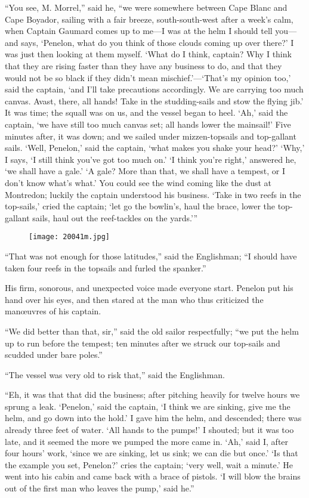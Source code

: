 “You see, M. Morrel,” said he, “we were somewhere between Cape Blanc
and Cape Boyador, sailing with a fair breeze, south-south-west after a
week’s calm, when Captain Gaumard comes up to me—I was at the helm I
should tell you—and says, ‘Penelon, what do you think of those clouds
coming up over there?’ I was just then looking at them myself. ‘What do
I think, captain? Why I think that they are rising faster than they
have any business to do, and that they would not be so black if they
didn’t mean mischief.’—‘That’s my opinion too,’ said the captain, ‘and
I’ll take precautions accordingly. We are carrying too much canvas.
Avast, there, all hands! Take in the studding-sails and stow the flying
jib.’ It was time; the squall was on us, and the vessel began to heel.
‘Ah,’ said the captain, ‘we have still too much canvas set; all hands
lower the mainsail!’ Five minutes after, it was down; and we sailed
under mizzen-topsails and top-gallant sails. ‘Well, Penelon,’ said the
captain, ‘what makes you shake your head?’ ‘Why,’ I says, ‘I still
think you’ve got too much on.’ ‘I think you’re right,’ answered he, ‘we
shall have a gale.’ ‘A gale? More than that, we shall have a tempest,
or I don’t know what’s what.’ You could see the wind coming like the
dust at Montredon; luckily the captain understood his business. ‘Take
in two reefs in the top-sails,’ cried the captain; ‘let go the
bowlin’s, haul the brace, lower the top-gallant sails, haul out the
reef-tackles on the yards.’”

\begin{figure}[ht]
\texttt{[image: 20041m.jpg]}
\end{figure}

“That was not enough for those latitudes,” said the Englishman; “I
should have taken four reefs in the topsails and furled the spanker.”

His firm, sonorous, and unexpected voice made everyone start. Penelon
put his hand over his eyes, and then stared at the man who thus
criticized the manœuvres of his captain.

“We did better than that, sir,” said the old sailor respectfully; “we
put the helm up to run before the tempest; ten minutes after we struck
our top-sails and scudded under bare poles.”

“The vessel was very old to risk that,” said the Englishman.

“Eh, it was that that did the business; after pitching heavily for
twelve hours we sprung a leak. ‘Penelon,’ said the captain, ‘I think we
are sinking, give me the helm, and go down into the hold.’ I gave him
the helm, and descended; there was already three feet of water. ‘All
hands to the pumps!’ I shouted; but it was too late, and it seemed the
more we pumped the more came in. ‘Ah,’ said I, after four hours’ work,
‘since we are sinking, let us sink; we can die but once.’ ‘Is that the
example you set, Penelon?’ cries the captain; ‘very well, wait a
minute.’ He went into his cabin and came back with a brace of pistols.
‘I will blow the brains out of the first man who leaves the pump,’ said
he.”

